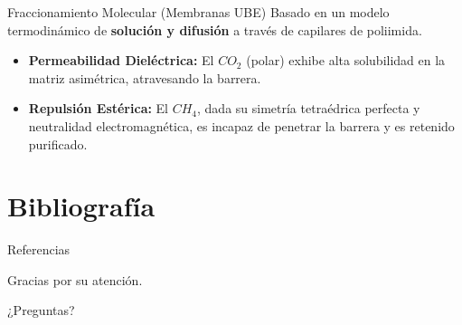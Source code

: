 \documentclass[aspectratio=169,sn-mathphys-num,spanish]{beamer}
\begin{document}
\begin{frame}{Fraccionamiento Molecular (Membranas UBE)}
	Basado en un modelo termodinámico de \textbf{solución y difusión} a través
	de capilares de poliimida.

	\vspace{0.5cm}
	\begin{itemize}
		\item \textbf{Permeabilidad Dieléctrica:} El $CO_2$ (polar) exhibe alta
			solubilidad en la matriz asimétrica, atravesando la barrera.
		\item \textbf{Repulsión Estérica:} El $CH_4$, dada su simetría tetraédrica
			perfecta y neutralidad electromagnética, es incapaz de penetrar la
			barrera y es retenido purificado.
	\end{itemize}
\end{frame}

\section{Bibliografía}
\begin{frame}[allowframebreaks]{Referencias}
	\printbibliography
	\nocite{*}
\end{frame}

\begin{frame}{}
	\centering
	{\LARGE Gracias por su atención.}
	\vspace{0.5cm}

	\Large ¿Preguntas?
\end{frame}
\end{document}
